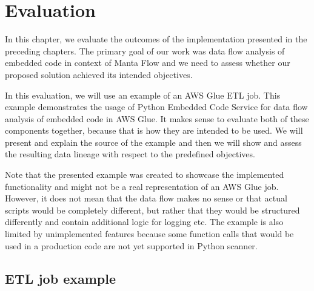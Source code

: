 \chapter{Evaluation}

In this chapter, we evaluate the outcomes of the implementation presented in the preceding chapters. The primary goal of our work was data flow analysis of embedded code in context of Manta Flow and we need to assess whether our proposed solution achieved its intended objectives.
\par
In this evaluation, we will use an example of an AWS Glue ETL job. This example demonstrates the usage of Python Embedded Code Service for data flow analysis of embedded code in AWS Glue. It makes sense to evaluate both of these components together, because that is how they are intended to be used. We will present and explain the source of the example and then we will show and assess the resulting data lineage with respect to the predefined objectives.
\par
Note that the presented example was created to showcase the implemented functionality and might not be a real representation of an AWS Glue job. However, it does not mean that the data flow makes no sense or that actual scripts would be completely different, but rather that they would be structured differently and contain additional logic for logging etc. The example is also limited by unimplemented features because some function calls that would be used in a production code are not yet supported in Python scanner.

\section{ETL job example}

